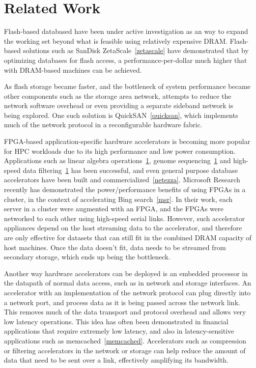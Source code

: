 
\section{Related Work}

Flash-based databased have been under active investigation as an way to expand
the working set beyond what is feasible using relatively expensive DRAM.
Flash-based solutions such as SanDisk ZetaScale~\ref{zetascale} have
demonstrated that by optimizing databases for flash access, a
performance-per-dollar much higher that with DRAM-based machines can be
achieved.

As flash storage became faster, and the bottleneck of system performance became
other components such as the storage area network, attempts to reduce the
network software overhead or even providing a separate sideband network is being
explored. One such solution is QuickSAN~\ref{quicksan}, which implements much of
the network protocol in a reconfigurable hardware fabric.

FPGA-based application-specific hardware accelerators is becoming more popular
for HPC workloads due to its high performance and low power consumption.
Applications such as linear algebra operations~\ref{}, genome sequencing~\ref{}
and high-speed data filtering~\ref{} has been successful, and even general
purpose database accelerators have been built and commercialized~\ref{netezza}.
Microsoft Research recently has demonstrated the power/performance
benefits of using FPGAs in a cluster, in the context of accelerating Bing
search~\ref{msr}. In their work, each server in a cluster were augmented with an FPGA, and
the FPGAs were networked to each other using high-speed serial links.
However, such accelerator appliances depend on the host streaming data to the
accelerator, and therefore are only effective for datasets that can
still fit in the combined DRAM capacity of host machines. Once the data doesn't
fit, data needs to be streamed from secondary storage, which ends up being the
bottleneck.

Another way hardware accelerators can be deployed is an embedded processor in
the datapath of normal data access, such as in network and storage interfaces. 
An accelerator with an implementation of the
network protocol can plug directly into a network
port, and process data as it is being passed across the network link. This
removes much of the data transport and protocol overhead and allows very low
latency operations. This idea has often been demonstrated in financial
applications that require extremely low latency, and also in latency-sensitive
applications such as memcached~\ref{memcached}. Accelerators such as compression
or filtering accelerators in the network or storage can help reduce the amount
of data that need to be sent over a link, effectively amplifying its bandwidth.


